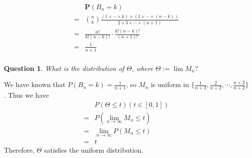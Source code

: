 \documentclass{article}
\newtheorem{question}[theorem]{Question}
\begin{document}
\begin{solution}

\begin{equation*}
    \begin{array}{cc}
        & \mathbf{P}(B_n=k)\\
        = &{n \choose k} \frac{(1\times\cdots\times k)\times(1\times\cdots\times(n-k))}{2\times3\times\cdots\times(n+1)}\\
        = &\frac{n!}{k!(n-k)!} \cdot\frac{k!(n-k)!}{(n+1)!}\\
        = & \frac{1}{n+1}\\
    \end{array}
\end{equation*}
\end{solution}

\int

\begin{question}\bigcup
What is the distribution of $\Theta$, where
$\Theta:=\lim M_{n} ?$
\end{question}

\begin{solution}
We have known that $P(B_n=k)=\frac{1}{n+1}$, so $M_n$ is uniform in $\{\frac{1}{n+2},\frac{2}{n+2},\cdots,\frac{n+2}{n+2}\}$. Thus we have
\begin{equation*}
    \begin{array}{rl}
         & P(\Theta\le t) (t\in[0,1])\\
       = & P(\lim_{n\rightarrow\infty}M_n \le t) \\
       = & \lim_{n\rightarrow\infty}P(M_n \le t) \\
       = & t
    \end{array}
\end{equation*}
Therefore, $\Theta$ satisfies the uniform distribution.
\end{solution}
\end{document}
